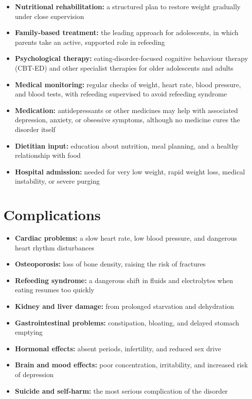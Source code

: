 \begin{itemize}
    \item \textbf{Nutritional rehabilitation:} a structured plan to restore weight gradually under close supervision
    \item \textbf{Family-based treatment:} the leading approach for adolescents, in which parents take an active, supported role in refeeding
    \item \textbf{Psychological therapy:} eating-disorder-focused cognitive behaviour therapy (CBT-ED) and other specialist therapies for older adolescents and adults
    \item \textbf{Medical monitoring:} regular checks of weight, heart rate, blood pressure, and blood tests, with refeeding supervised to avoid refeeding syndrome
    \item \textbf{Medication:} antidepressants or other medicines may help with associated depression, anxiety, or obsessive symptoms, although no medicine cures the disorder itself
    \item \textbf{Dietitian input:} education about nutrition, meal planning, and a healthy relationship with food
    \item \textbf{Hospital admission:} needed for very low weight, rapid weight loss, medical instability, or severe purging
\end{itemize}

\section*{Complications}
\begin{itemize}
    \item \textbf{Cardiac problems:} a slow heart rate, low blood pressure, and dangerous heart rhythm disturbances
    \item \textbf{Osteoporosis:} loss of bone density, raising the risk of fractures
    \item \textbf{Refeeding syndrome:} a dangerous shift in fluids and electrolytes when eating resumes too quickly
    \item \textbf{Kidney and liver damage:} from prolonged starvation and dehydration
    \item \textbf{Gastrointestinal problems:} constipation, bloating, and delayed stomach emptying
    \item \textbf{Hormonal effects:} absent periods, infertility, and reduced sex drive
    \item \textbf{Brain and mood effects:} poor concentration, irritability, and increased risk of depression
    \item \textbf{Suicide and self-harm:} the most serious complication of the disorder
\end{itemize}

